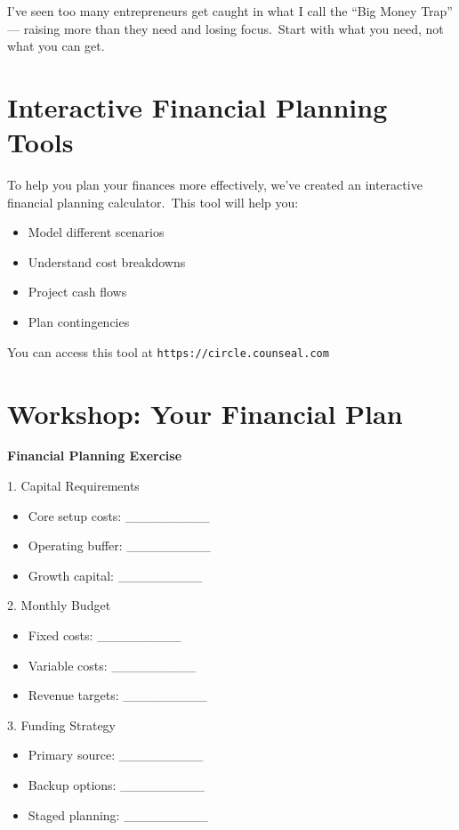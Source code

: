 \begin{warningbox}
I've seen too many entrepreneurs get caught in what I call the ``Big Money Trap'' --- raising more than they need and losing focus.\ Start with what you need, not what you can get.
\end{warningbox}

\section{Interactive Financial Planning Tools}\label{sec:financial-tools}

To help you plan your finances more effectively, we've created an interactive financial planning calculator.\ This tool will help you:

\begin{itemize}
    \item Model different scenarios
    \item Understand cost breakdowns
    \item Project cash flows
    \item Plan contingencies
\end{itemize}

You can access this tool at \texttt{https://circle.counseal.com}

\section{Workshop: Your Financial Plan}\label{sec:workshop}

\begin{workshopbox}
\textbf{Financial Planning Exercise}

1. Capital Requirements
\begin{itemize}
    \item Core setup costs: \_\_\_\_\_\_\_\_\_
    \item Operating buffer: \_\_\_\_\_\_\_\_\_
    \item Growth capital: \_\_\_\_\_\_\_\_\_
\end{itemize}

2. Monthly Budget
\begin{itemize}
    \item Fixed costs: \_\_\_\_\_\_\_\_\_
    \item Variable costs: \_\_\_\_\_\_\_\_\_
    \item Revenue targets: \_\_\_\_\_\_\_\_\_
\end{itemize}

3. Funding Strategy
\begin{itemize}
    \item Primary source: \_\_\_\_\_\_\_\_\_
    \item Backup options: \_\_\_\_\_\_\_\_\_
    \item Staged planning: \_\_\_\_\_\_\_\_\_
\end{itemize}
\end{workshopbox}

